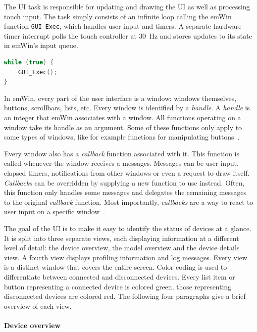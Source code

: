The UI task is responsible for updating and drawing the UI as well as processing touch input. The
task simply consists of an infinite loop calling the emWin function \mbox{\lstinline{GUI_Exec},}
which handles user input and timers. A separate hardware timer interrupt polls the touch controller
at \SI{30}{\hertz} and stores updates to its state in emWin's input queue.

\begin{lstlisting}[language=C++, caption={Main loop of the UI task}]
while (true) {
    GUI_Exec();
}
\end{lstlisting}

In emWin, every part of the user interface is a window: windows themselves, buttons, scrollbars,
lists, etc. Every window is identified by a \textit{handle}. A \textit{handle} is an integer that
emWin associates with a window. All functions operating on a window take its handle as an argument.
Some of these functions only apply to some types of windows, like for example functions for
manipulating buttons~\cite{emwin-manual}.

Every window also has a \textit{callback} function associated with it. This function is called whenever
the window receives a messages. Messages can be user input, elapsed timers, notifications from other
windows or even a request to draw itself. \textit{Callbacks} can be overridden by supplying a new
function to use instead. Often, this function only handles some messages and delegates the remaining
messages to the original \textit{callback} function. Most importantly, \textit{callbacks} are a way
to react to user input on a specific window~\cite{emwin-manual}.

The goal of the UI is to make it easy to identify the status of devices at a glance. It is split
into three separate views, each displaying information at a different level of detail: the device
overview, the model overview and the device details view. A fourth view displays profiling information
and log messages. Every view is a distinct window that covers the entire screen. Color coding is used
to differentiate between connected and disconnected devices. Every list item or button representing
a connected device is colored green, those representing disconnected devices are colored red. The
following four paragraphs give a brief overview of each view.

\paragraph{Device overview}

